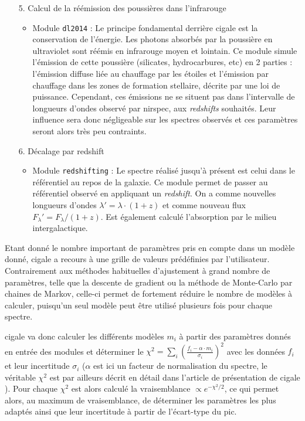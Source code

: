 \documentclass[12pt, a4paper]{article}
\begin{document}
\begin{itemize}
  \item[5.] Calcul de la réémission des poussières dans l'infrarouge
  \begin{itemize}
    \item Module \texttt{dl2014} : Le principe fondamental derrière \gls{cigale} est la conservation de l'énergie. Les photons absorbés par la poussière en ultraviolet sont réémis en infrarouge moyen et lointain. Ce module simule l'émission de cette poussière (silicates, hydrocarbures, etc) en 2 parties : l'émission diffuse liée au chauffage par les étoiles et l'émission par chauffage dans les zones de formation stellaire, décrite par une loi de puissance. Cependant, ces émissions ne se situent pas dans l'intervalle de longueurs d'ondes observé par \gls{nirspec}, aux \textit{redshifts} souhaités. Leur influence sera donc négligeable sur les spectres observés et ces paramètres seront alors très peu contraints.
    
  \end{itemize}
  \item[6.] Décalage par redshift
  \begin{itemize}
    \item Module \texttt{redshifting} : Le spectre réalisé jusqu'à présent est celui dans le référentiel au repos de la galaxie. Ce module permet de passer au référentiel observé en appliquant un \textit{redshift}. On a comme nouvelles longueurs d'ondes $\lambda' = \lambda \cdot (1+z)$ et comme nouveau flux $F_\lambda' = F_\lambda / (1+z)$. Est également calculé l'absorption par le milieu intergalactique.
  
  \end{itemize}
\end{itemize}

Etant donné le nombre important de paramètres pris en compte dans un modèle donné, \gls{cigale} a recours à une grille de valeurs prédéfinies par l'utilisateur. Contrairement aux méthodes habituelles d'ajustement à grand nombre de paramètres, telle que la descente de gradient ou la méthode de Monte-Carlo par chaines de Markov, celle-ci permet de fortement réduire le nombre de modèles à calculer, puisqu'un seul modèle peut être utilisé plusieurs fois pour chaque spectre.

\gls{cigale} va donc calculer les différents modèles $m_i$ à partir des paramètres donnés en entrée des modules et déterminer le $\chi^2 = \sum_{i} (\frac{f_i - \alpha \cdot m_i}{\sigma_i})^2$ avec les données $f_i$ et leur incertitude $\sigma_i$ ($\alpha$ est ici un facteur de normalisation du spectre, le véritable $\chi^2$ est par ailleurs décrit en détail dans l'article de présentation de \gls{cigale} \parencite{cigale}). Pour chaque $\chi^2$ est alors calculé la vraisemblance $\propto e^{-\chi^2 / 2}$, ce qui permet alors, au maximum de vraisemblance, de déterminer les paramètres les plus adaptés ainsi que leur incertitude à partir de l'écart-type du pic.\\
\end{document}
